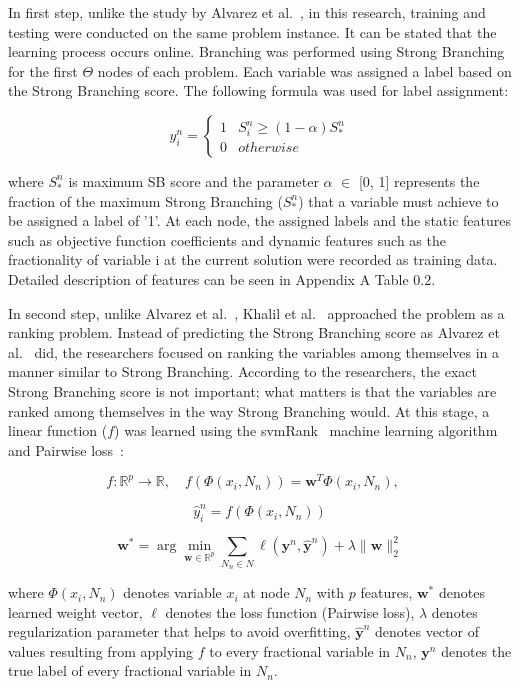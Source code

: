 In first step, unlike the study by Alvarez et al.~\cite{alvarezMachineLearningBasedApproximation2017}, in this research, training and testing were conducted on the same problem instance.
It can be stated that the learning process occurs online.
Branching was performed using Strong Branching for the first $\Theta$ nodes of each problem.
Each variable was assigned a label based on the Strong Branching score.
The following formula was used for label assignment:

\[ y_i^n = \begin{cases}
      1 & S_i^n\geq (1-\alpha)S_*^n \\
      0 & otherwise
   \end{cases}
\]

where $S_*^n$ is maximum SB score and the parameter $\alpha$ $\in$ [0, 1] represents the fraction of the maximum Strong Branching ($S_*^n$) that a variable must achieve to be assigned a label of '1'.
At each node, the assigned labels and the static features such as objective function coefficients and dynamic features such as the fractionality of variable i at the current solution were recorded as training data.
Detailed description of features can be seen in Appendix A Table 0.2. %


In second step, unlike Alvarez et al.~\cite{alvarezMachineLearningBasedApproximation2017}, Khalil et al.~\cite{khalilLearningBranchMixed2016} approached the problem as a ranking problem.
Instead of predicting the Strong Branching score as Alvarez et al.~\cite{alvarezMachineLearningBasedApproximation2017} did, the researchers focused on ranking the variables among themselves in a manner similar to Strong Branching.
According to the researchers, the exact Strong Branching score is not important; what matters is that the variables are ranked among themselves in the way Strong Branching would.
At this stage, a linear function ($f$) was learned using the svmRank~\cite{joachimsTrainingLinearSVMs2006} machine learning algorithm and Pairwise loss~\cite{joachimsOptimizingSearchEngines}:

\[
f: \mathbb{R}^p \rightarrow \mathbb{R}, \quad
f\left(\Phi(x_i, N_n)\right) = \mathbf{w}^T \Phi(x_i, N_n), \quad
\]

\[
\hat{y}_i^n = f\left(\Phi(x_i, N_n)\right)
\]

\[
\mathbf{w}^* = \arg\min_{\mathbf{w} \in \mathbb{R}^p}
\sum_{N_n \in N} \ell(\mathbf{y}^n, \hat{\mathbf{y}}^n)
+ \lambda \| \mathbf{w} \|_2^2
\]

where $\Phi(x_i, N_n)$ denotes variable $x_i$ at node $N_n$ with $p$ features, $\mathbf{w}^*$ denotes learned weight vector, $\ell$ denotes the loss function (Pairwise loss), $\lambda$ denotes regularization parameter that helps to avoid overfitting, $\hat{\mathbf{y}}^n$ denotes vector of values resulting from applying $f$ to every fractional variable in $N_n$, $\mathbf{y}^n$ denotes the true label of every fractional variable in $N_n$.


